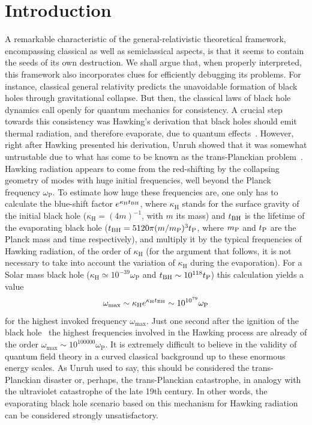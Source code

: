 \documentclass[12pt]{article}
\begin{document}
\section{Introduction}
\label{Sec:Introduction}

A remarkable characteristic of the general-relativistic theoretical 
framework, encompassing classical as well as semiclassical aspects, is 
that it seems to contain the seeds of its own destruction. We shall argue that, 
when properly interpreted, this framework also incorporates clues for 
efficiently debugging its problems. For instance, 
classical general relativity predicts the unavoidable formation of black holes
through gravitational collapse.  But then, the classical laws of black hole
dynamics call openly for quantum mechanics for consistency. A crucial step
towards this consistency was  Hawking's derivation that black holes should emit
thermal radiation, and therefore evaporate, due to quantum
effects~\cite{hawking1, hawking2}. However, right after Hawking presented his derivation,  
Unruh showed that it was somewhat untrustable due to what has come to be known
as the trans-Planckian problem~\cite{unruh-notes}.  Hawking radiation appears to
come from the red-shifting  by the collapsing geometry of modes with huge initial
frequencies, well beyond the Planck frequency $\omega_\text{P}$.  To estimate
how huge these frequencies are, one only has to calculate the blue-shift factor
$e^{\kappa_\text{H} t_{\rm BH}}$, where $\kappa_\text{H}$ stands for the surface gravity  of the
initial black hole ($\kappa_\text{H}=(4m)^{-1}$, with $m$ its mass) and $t_{\rm BH}$ is the lifetime of the evaporating black hole ($t_{\rm BH}=5120\pi (m/m_\text{P})^3 t_{\rm P}$, where $m_{\rm P}$ and $t_{\rm P}$ are the Planck mass and time respectively), and multiply it by the typical
frequencies of Hawking radiation, of the order of $\kappa_\text{H}$ (for the argument that follows, it is not necessary to take into account the variation of $\kappa_\text{H}$ during the evaporation).  For a Solar mass
black hole ($\kappa_\text{H}\simeq10^{-39} \omega_\text{P}$ and $t_{\rm BH} \sim10^{118}t_{\rm P}$) this calculation yields a value 
\begin{equation}
\omega_\text{max} 
\sim\kappa_\text{H}e^{\kappa_\text{H} t_{\rm BH}}\sim 10^{10^{79}}\omega_\text{P}
\end{equation}
for the highest invoked frequency $\omega_\text{max}$. 
Just one second after the ignition of the black
hole~\cite{barbado} the highest frequencies involved in the Hawking process are already
of the order $\omega_\text{max}  \sim 10^{100000}\omega_\text{P}$.  It is
extremely difficult to believe in the validity of quantum field theory in a
curved classical background up to these enormous energy scales.  As Unruh used
to say, this should be considered the trans-Planckian disaster or, perhaps, the
trans-Planckian catastrophe, in analogy with the ultraviolet catastrophe of the
late 19th century. In other words,
the evaporating black hole scenario based on this mechanism for Hawking radiation can
be considered strongly unsatisfactory.  
\end{document}
